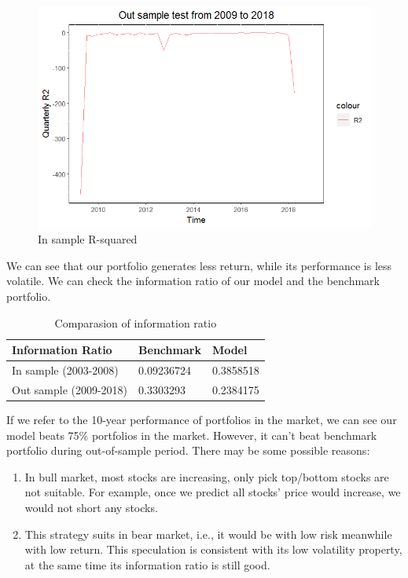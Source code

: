 \documentclass[]{article}
\begin{document}
\begin{figure}[H]
\begin{center}
\includegraphics[width=5in]{Lab//Out_sample_r2.jpg}
\caption{In sample R-squared}
\label{figure13}
\end{center}
\end{figure}

We can see that our portfolio generates less return, while its
performance is less volatile. We can check the information ratio of our
model and the benchmark portfolio.

\begin{table}[H]
\begin{center}
\caption{Comparasion of information ratio}
\label{table1}
\centering
\begin{tabular}{l l l}\hline
Information Ratio & Benchmark   & Model \\ \hline
In sample (2003-2008) & 0.09236724 & 0.3858518 \\
Out sample (2009-2018) & 0.3303293 & 0.2384175 \\
\hline
\end{tabular}
\end{center}
\end{table}

If we refer to the 10-year performance of portfolios in the market, we
can see our model beats 75\% portfolios in the market. However, it can't
beat benchmark portfolio during out-of-sample period. There may be some
possible reasons:

\begin{enumerate}
\def\labelenumi{\arabic{enumi}.}
\item
  In bull market, most stocks are increasing, only pick top/bottom
  stocks are not suitable. For example, once we predict all stocks'
  price would increase, we would not short any stocks.
\item
  This strategy suits in bear market, i.e., it would be with low risk
  meanwhile with low return. This speculation is consistent with its low
  volatility property, at the same time its information ratio is still
  good.
\end{enumerate}
\end{document}
